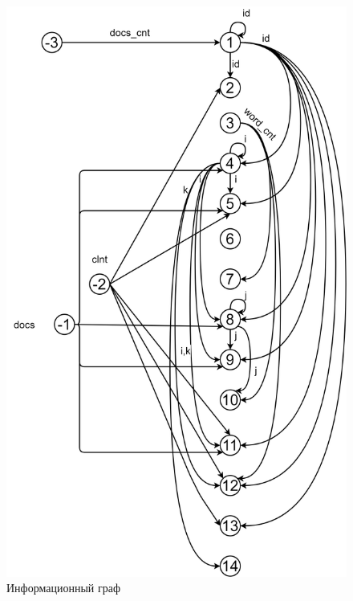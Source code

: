 \begin{figure}[h]
	\centering
	\includegraphics[height=0.9\textheight]{img/ИГ.png}
	\caption{Информационный граф}
	\label{fig:g2}
\end{figure}

